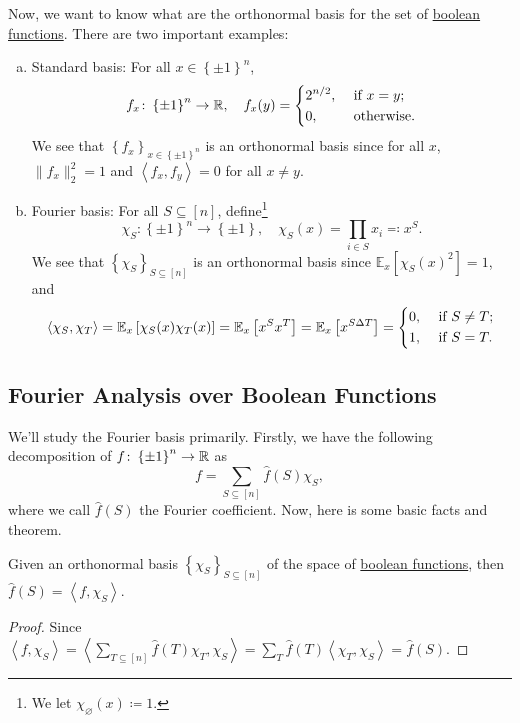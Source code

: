 Now, we want to know what are the orthonormal basis for the set of \hyperref[def:boolean-function]{boolean functions}. There are two important examples:
\begin{enumerate}[(a)]
	\item Standard basis: For all \(x\in \left\{ \pm 1\right\}^n\),
	      \[
		      f_x \colon \left\{ \pm 1 \right\} ^n \to  \mathbb{\MakeUppercase{r}} ,\quad
		      f_x (y) = \begin{dcases}
			      2^{n / 2}, & \text{ if } x=y ;   \\
			      0,         & \text{ otherwise} .
		      \end{dcases}
	      \]
	      We see that \(\left\{ f_x \right\} _{x\in \left\{ \pm 1 \right\} ^n}\) is an orthonormal basis since for all \(x\), \(\lVert f_x \rVert _2^2 = 1\) and \(\left\langle f_x, f_y \right\rangle = 0\) for all \(x \neq y\).
	\item Fourier basis: For all \(S \subseteq [n]\), define\footnote{We let \(\chi _\varnothing (x) \coloneqq 1\).}
	      \[
		      \chi _S \colon \left\{ \pm 1 \right\} ^n \to  \left\{ \pm 1 \right\} ,\quad
		      \chi _S (x) = \prod_{i\in S} x_i \eqqcolon x^S.
	      \]
	      We see that \(\left\{ \chi _S \right\}_{S \subseteq [n]} \) is an orthonormal basis since \(\mathbb{E}_{x}\left[\chi _S(x)^2 \right] = 1\), and
	      \[
		      \left\langle \chi _S, \chi _T \right\rangle
		      = \mathbb{E}_{x}\left[\chi _S(x) \chi _T(x) \right]
		      = \mathbb{E}_{x}\left[x^S x^T \right]
		      = \mathbb{E}_{x}\left[x^{S \Delta T} \right]
		      = \begin{dcases}
			      0, & \text{ if } S \neq T ; \\
			      1, & \text{ if } S = T .
		      \end{dcases}
	      \]
\end{enumerate}

\subsection{Fourier Analysis over Boolean Functions}
We'll study the Fourier basis primarily. Firstly, we have the following decomposition of \(f\colon \left\{ \pm 1 \right\} ^n \to  \mathbb{\MakeUppercase{r}} \) as
\[
	f = \sum_{S \subseteq [n]} \hat{f} (S) \chi _S,
\]
where we call \(\hat{f} (S)\) the Fourier coefficient. Now, here is some basic facts and theorem.

\begin{proposition}
	Given an orthonormal basis \(\left\{ \chi _S \right\}_{S\subseteq [n]} \) of the space of \hyperref[def:boolean-function]{boolean functions}, then \(\hat{f} (S) = \left\langle f, \chi _S \right\rangle \).
\end{proposition}
\begin{proof}
	Since \(\left\langle f, \chi _S \right\rangle
	= \left\langle \sum_{T \subseteq [n]} \hat{f} (T) \chi _T, \chi _S \right\rangle
	= \sum_{T} \hat{f} (T) \left\langle \chi _T, \chi _S \right\rangle
	= \hat{f} (S)\).
\end{proof}

